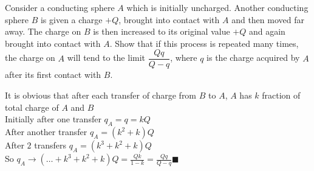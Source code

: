 \documentclass[../main.tex]{subfiles}
\begin{document}
\begin{questions}

\question Consider a conducting sphere $A$ which is initially uncharged. Another conducting sphere $B$ is given a charge $+Q$, brought into contact with $A$ and then moved far away. The charge on $B$ is then increased to its original value $+Q$ and again brought into contact with $A$. Show that if this process is repeated many times, the charge on $A$ will tend to the limit $\dfrac{Qq}{Q-q}$, where $q$ is the charge acquired by $A$ after its first contact with $B$.
\begin{solution}
	It is obvious that after each transfer of charge from $B$ to $A$, $A$ has $k$ fraction of total charge of $A$ and $B$ \\
	Initially after one transfer $q_A = q = kQ$ \\
	After another transfer $q_A = (k^2+k)Q$ \\
	After $2$ transfers $q_A = (k^3 + k^2 + k)Q$ \\
	So $q_A \to (\hdots + k^3 + k^2 + k)Q = \frac{Qk}{1-k} = \frac{Qq}{Q-q}$\hfill$\blacksquare$
\end{solution}


\end{questions}
\end{document}

